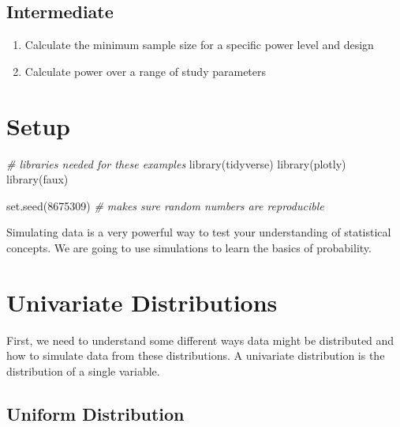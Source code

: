 \documentclass[
  oneside]{book}
\newenvironment{Shaded}{\begin{snugshade}}{\end{snugshade}}
\newcommand{\CommentTok}[1]{\textcolor[rgb]{0.56,0.35,0.01}{\textit{#1}}}
\newcommand{\DecValTok}[1]{\textcolor[rgb]{0.00,0.00,0.81}{#1}}
\newcommand{\FunctionTok}[1]{\textcolor[rgb]{0.00,0.00,0.00}{#1}}
\newcommand{\NormalTok}[1]{#1}
\providecommand{\tightlist}{%
  \setlength{\itemsep}{0pt}\setlength{\parskip}{0pt}}
\begin{document}
\hypertarget{intermediate-6}{%
\subsection*{Intermediate}\label{intermediate-6}}

\begin{enumerate}
\def\labelenumi{\arabic{enumi}.}
\setcounter{enumi}{4}
\tightlist
\item
  Calculate the minimum sample size for a specific power level and design
\item
  Calculate power over a range of study parameters
\end{enumerate}

\hypertarget{setup8}{%
\section{Setup}\label{setup8}}

\begin{Shaded}
\begin{Highlighting}[]
\CommentTok{\# libraries needed for these examples}
\FunctionTok{library}\NormalTok{(tidyverse)}
\FunctionTok{library}\NormalTok{(plotly)}
\FunctionTok{library}\NormalTok{(faux)}

\FunctionTok{set.seed}\NormalTok{(}\DecValTok{8675309}\NormalTok{) }\CommentTok{\# makes sure random numbers are reproducible}
\end{Highlighting}
\end{Shaded}

Simulating data is a very powerful way to test your understanding of statistical concepts. We are going to use simulations to learn the basics of probability.

\hypertarget{univariate-distributions}{%
\section{Univariate Distributions}\label{univariate-distributions}}

First, we need to understand some different ways data might be distributed and how to simulate data from these distributions. A univariate distribution is the distribution of a single variable.

\hypertarget{uniform}{%
\subsection{Uniform Distribution}\label{uniform}}
\end{document}
